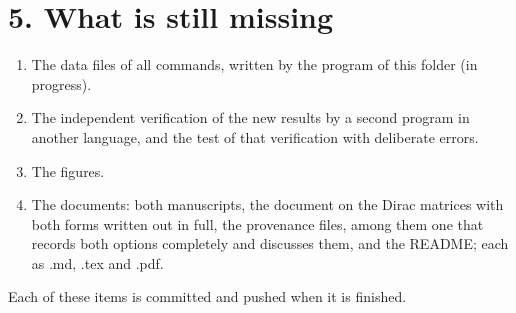 \documentclass[
  11pt,
]{article}
\providecommand{\tightlist}{%
  \setlength{\itemsep}{0pt}\setlength{\parskip}{0pt}}
\begin{document}
\hypertarget{what-is-still-missing}{%
\section{5. What is still missing}\label{what-is-still-missing}}

\begin{enumerate}
\def\labelenumi{\arabic{enumi}.}
\tightlist
\item
  The data files of all commands, written by the program of this folder
  (in progress).
\item
  The independent verification of the new results by a second program in
  another language, and the test of that verification with deliberate
  errors.
\item
  The figures.
\item
  The documents: both manuscripts, the document on the Dirac matrices
  with both forms written out in full, the provenance files, among them
  one that records both options completely and discusses them, and the
  README; each as .md, .tex and .pdf.
\end{enumerate}

Each of these items is committed and pushed when it is finished.
\end{document}
